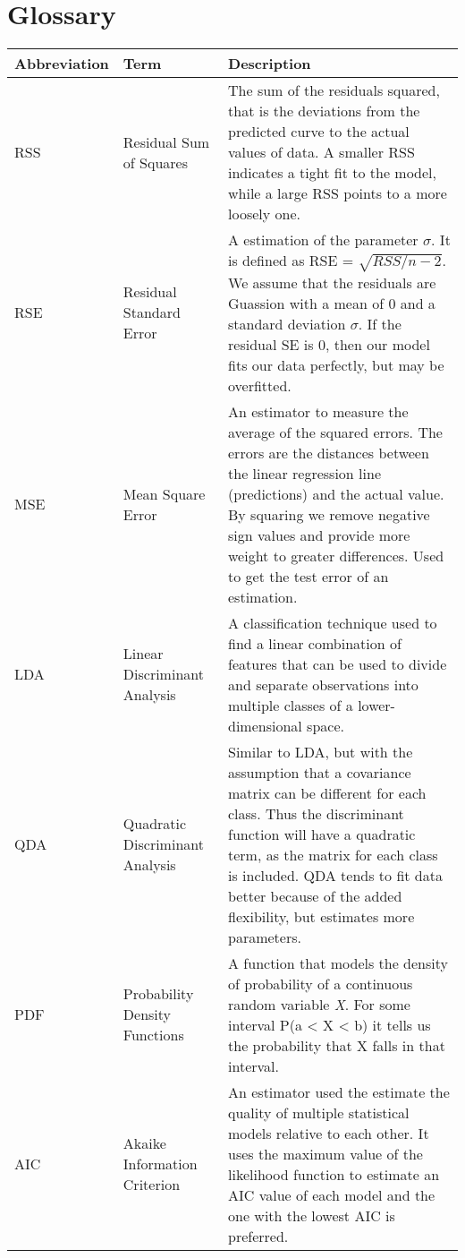 \chapter*{Glossary}

\begin{table}[H]
	\centering
	\begin{tabularx}{\linewidth}{|l|l|X|}
		\hline
		\textbf{Abbreviation} 	& \textbf{Term} 					& \textbf{Description} 		\\ \hline
		RSS 					& Residual Sum of Squares			& The sum of the residuals squared, that is the deviations from the predicted curve to the actual values of data. A smaller RSS indicates a tight fit to the model, while a large RSS points to a more loosely one. \\ \hline
		RSE 					& Residual Standard Error			& A estimation of the parameter $\sigma$. It is defined as RSE = $\sqrt{RSS/n-2}$. We assume that the residuals are Guassion with a mean of 0 and a standard deviation $\sigma$. If the residual SE is 0, then our model fits our data perfectly, but may be overfitted.  \\ \hline
		MSE 					& Mean Square Error					& An estimator to measure the average of the squared errors. The errors are the distances between the linear regression line (predictions) and the actual value. By squaring we remove negative sign values and provide more weight to greater differences. Used to get the test error of an estimation. \\ \hline
		LDA 					& Linear Discriminant Analysis		& A classification technique used to find a linear combination of features that can be used to divide and separate observations into multiple classes of a lower-dimensional space. \\ \hline
		QDA 					& Quadratic Discriminant Analysis	& Similar to LDA, but with the assumption that a covariance matrix can be different for each class. Thus the discriminant function will have a quadratic term, as the matrix for each class is included. QDA tends to fit data better because of the added flexibility, but estimates more parameters. \\ \hline
		PDF						& Probability Density Functions		& A function that models the density of probability of a continuous random variable \textit{X}. For some interval P(a < X < b) it tells us the probability that X falls in that interval. \\ \hline
		AIC						& Akaike Information Criterion		& An estimator used the estimate the quality of multiple statistical models relative to each other. It uses the maximum value of the likelihood function to estimate an AIC value of each model and the one with the lowest AIC is preferred. \\ \hline

\end{tabularx}
\end{table}
